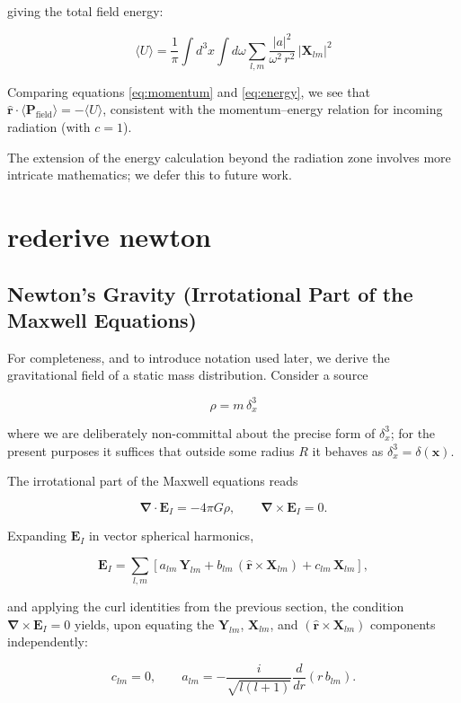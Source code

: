 \documentclass {article}
\renewcommand\vec{\mathbf}
\let\OldS\nabla
\renewcommand{\nabla}{\boldsymbol{\OldS}}
\let\OldHat\hat
\renewcommand{\hat}[1]{\OldHat{\mathbf{#1}}}
\begin{document}
\noindent giving the total field energy:

\begin{equation}
\boxed{
	\langle U \rangle = \frac{1}{\pi} \int d^3x \int d\omega \sum_{l,m} \frac{|a|^2}{\omega^2\, r^2}\, |\vec{X}_{lm}|^2
}
\label{eq:energy}
\end{equation}

\noindent Comparing equations \eqref{eq:momentum} and \eqref{eq:energy}, we see that $\hat{r} \cdot \langle \vec{P}_{\text{field}} \rangle = -\langle U \rangle$, consistent with the momentum--energy relation for incoming radiation (with $c = 1$).

The extension of the energy calculation beyond the radiation zone involves more intricate mathematics; we defer this to future work.


\newpage

\section{rederive newton}
\subsection{Newton's Gravity (Irrotational Part of the Maxwell Equations)}

For completeness, and to introduce notation used later, we derive the gravitational field of a static mass distribution. Consider a source

$$\rho = m\,\delta^3_x$$

where we are deliberately non-committal about the precise form of $\delta^3_x$; for the present purposes it suffices that outside some radius $R$ it behaves as $\delta^3_x = \delta(\vec x)$.

The irrotational part of the Maxwell equations reads

$$\nabla \cdot \vec{E}_I = -4\pi G\rho, \qquad \nabla \times \vec{E}_I = 0.$$

Expanding $\vec{E}_I$ in vector spherical harmonics,

$$\vec{E}_I = \sum_{l,m}\left[a_{lm}\,\vec{Y}_{lm} + b_{lm}\,(\hat r \times \vec{X}_{lm}) + c_{lm}\,\vec{X}_{lm}\right],$$

and applying the curl identities from the previous section, the condition $\nabla \times \vec{E}_I = 0$ yields, upon equating the $\vec{Y}_{lm}$, $\vec{X}_{lm}$, and $(\hat r \times \vec{X}_{lm})$ components independently:

$$c_{lm} = 0, \qquad a_{lm} = -\frac{i}{\sqrt{l(l+1)}}\frac{d}{dr}(r\,b_{lm}).$$
\end{document}
